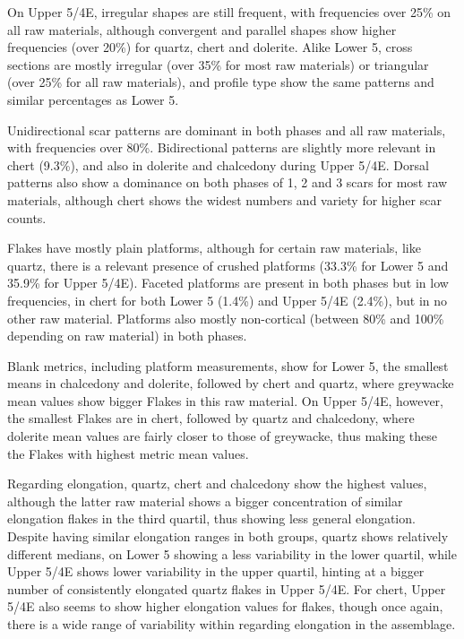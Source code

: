 \documentclass[12pt,twoside]{reedthesis}
\begin{document}
On Upper 5/4E, irregular shapes are still frequent, with frequencies over 25\% on all raw materials, although convergent and parallel shapes show higher frequencies (over 20\%) for quartz, chert and dolerite. Alike Lower 5, cross sections are mostly irregular (over 35\% for most raw materials) or triangular (over 25\% for all raw materials), and profile type show the same patterns and similar percentages as Lower 5.

Unidirectional scar patterns are dominant in both phases and all raw materials, with frequencies over 80\%. Bidirectional patterns are slightly more relevant in chert (9.3\%), and also in dolerite and chalcedony during Upper 5/4E. Dorsal patterns also show a dominance on both phases of 1, 2 and 3 scars for most raw materials, although chert shows the widest numbers and variety for higher scar counts.

Flakes have mostly plain platforms, although for certain raw materials, like quartz, there is a relevant presence of crushed platforms (33.3\% for Lower 5 and 35.9\% for Upper 5/4E). Faceted platforms are present in both phases but in low frequencies, in chert for both Lower 5 (1.4\%) and Upper 5/4E (2.4\%), but in no other raw material. Platforms also mostly non-cortical (between 80\% and 100\% depending on raw material) in both phases.

Blank metrics, including platform measurements, show for Lower 5, the smallest means in chalcedony and dolerite, followed by chert and quartz, where greywacke mean values show bigger Flakes in this raw material. On Upper 5/4E, however, the smallest Flakes are in chert, followed by quartz and chalcedony, where dolerite mean values are fairly closer to those of greywacke, thus making these the Flakes with highest metric mean values.

Regarding elongation, quartz, chert and chalcedony show the highest values, although the latter raw material shows a bigger concentration of similar elongation flakes in the third quartil, thus showing less general elongation. Despite having similar elongation ranges in both groups, quartz shows relatively different medians, on Lower 5 showing a less variability in the lower quartil, while Upper 5/4E shows lower variability in the upper quartil, hinting at a bigger number of consistently elongated quartz flakes in Upper 5/4E. For chert, Upper 5/4E also seems to show higher elongation values for flakes, though once again, there is a wide range of variability within regarding elongation in the assemblage.
\end{document}
